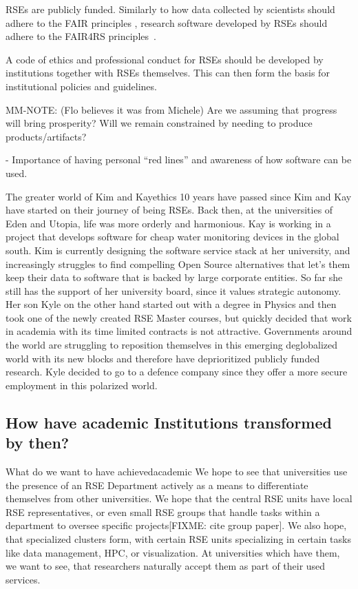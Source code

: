 \documentclass{eceasst}
\begin{document}
RSEs are publicly funded.
Similarly to how data collected by scientists should adhere to the FAIR principles \cite{FAIR}, research software developed by RSEs should adhere to the FAIR4RS principles~\cite{FAIR4RS}.

A code of ethics and professional conduct for RSEs should be developed by institutions together with RSEs themselves.
This can then form the basis for institutional policies and guidelines.

MM-NOTE: (Flo believes it was from Michele) Are we assuming that progress will bring prosperity? Will we remain constrained by needing to produce products/artifacts?

  - Importance of having personal “red lines” and awareness of how software can be used.

\begin{story}{The greater world of Kim and Kay}{ethics}
10 years have passed since Kim and Kay have started on their journey of being RSEs. Back then,
at the universities of Eden and Utopia, life was more orderly and harmonious. Kay is working in a project that develops
software for cheap water monitoring devices in the global south. Kim is currently designing the software service stack
at her university, and increasingly struggles to find compelling Open Source alternatives that let's them keep their data
to software that is backed by large corporate entities. So far she still has the support of her university board, since it values
strategic autonomy.
Her son Kyle on the other hand started out with a degree in Physics and then took one of the newly created RSE Master courses,
but quickly decided that work in academia with its time limited contracts is not attractive.
Governments around the world are struggling to reposition themselves in this emerging deglobalized world with its new blocks
and therefore have deprioritized publicly funded research. Kyle decided to go to a defence company since they offer a
more secure employment in this polarized world.
\end{story}

\subsection{How have academic Institutions transformed by then?}
\begin{whatis}{What do we want to have achieved}{academic}
We hope to see that universities use the presence of an RSE Department actively as a means to differentiate themselves from other universities.
We hope that the central RSE units have local RSE representatives, or even small RSE groups that handle tasks within a department to oversee specific projects[FIXME: cite group paper].
We also hope, that specialized clusters form, with certain RSE units specializing in certain tasks like data management, HPC, or visualization.
At universities which have them, we want to see, that researchers naturally accept them as part of their used services.
\end{whatis}
\end{document}

